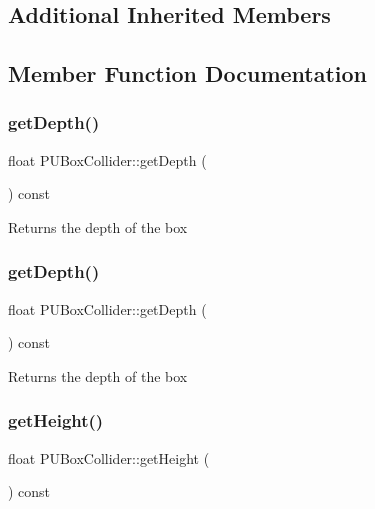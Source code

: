 \subsection*{Additional Inherited Members}


\subsection{Member Function Documentation}
\mbox{\label{classPUBoxCollider_a46d59e89fdeeccd6444135b0adda5f3c}} 
\subsubsection{\texorpdfstring{get\+Depth()}{getDepth()}\hspace{0.1cm}{\footnotesize\ttfamily [1/2]}}
{\footnotesize\ttfamily float P\+U\+Box\+Collider\+::get\+Depth (\begin{DoxyParamCaption}{ }\end{DoxyParamCaption}) const}

Returns the depth of the box \mbox{\label{classPUBoxCollider_a46d59e89fdeeccd6444135b0adda5f3c}} 
\subsubsection{\texorpdfstring{get\+Depth()}{getDepth()}\hspace{0.1cm}{\footnotesize\ttfamily [2/2]}}
{\footnotesize\ttfamily float P\+U\+Box\+Collider\+::get\+Depth (\begin{DoxyParamCaption}{ }\end{DoxyParamCaption}) const}

Returns the depth of the box \mbox{\label{classPUBoxCollider_a6377a68d34e05968b6c4eb3d085deaba}} 
\subsubsection{\texorpdfstring{get\+Height()}{getHeight()}\hspace{0.1cm}{\footnotesize\ttfamily [1/2]}}
{\footnotesize\ttfamily float P\+U\+Box\+Collider\+::get\+Height (\begin{DoxyParamCaption}{ }\end{DoxyParamCaption}) const}

